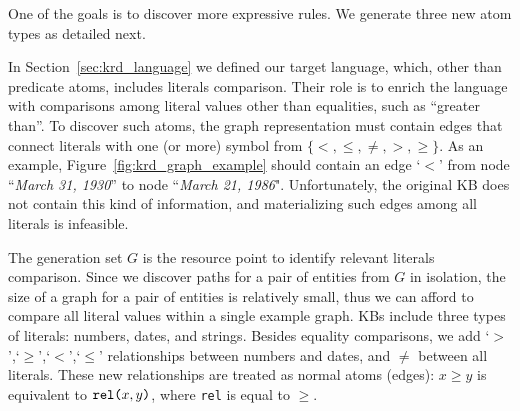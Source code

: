%

One of the goals is to discover more expressive rules. We generate three new atom types as detailed next.

\noindent {}
In Section~\ref{sec:krd_language} we defined our target language, which, other than predicate atoms, includes literals comparison. 
Their role is to enrich the language with comparisons among literal values other than equalities, such as ``greater than''. 
To discover such atoms, the graph representation must contain edges that connect literals with one (or more) symbol from $\{<,\leq,\neq,>,\geq\}$. As an example, Figure~\ref{fig:krd_graph_example} should contain an edge `$<$' from node ``\textit{March 31, 1930}'' to node ``\textit{March 21, 1986}". Unfortunately, the original KB does not contain this kind of information, and materializing such edges among all literals is infeasible.

The generation set $G$ is the resource point to identify relevant literals comparison.
Since we discover paths for a pair of entities from $G$ in isolation, the size of a graph for a pair of entities is relatively small, thus we can afford to compare all literal values within a single example graph. 
KBs include three types of literals: numbers, dates, and strings. Besides equality comparisons, we add `$>$',`$\geq$',`$<$',`$\leq$' relationships between numbers and dates, and $\neq$ between all literals. These new relationships are treated as normal atoms (edges): $x \geq y$ is equivalent to $\texttt{rel(}x,y\texttt{)}$, where \texttt{rel} is equal to $\geq$. 

